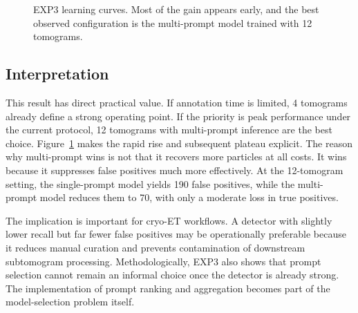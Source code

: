 \documentclass[12pt,a4paper]{report}
\begin{document}
\begin{figure}[H]
  \centering
  \caption{EXP3 learning curves. Most of the gain appears early, and the best observed configuration is the multi-prompt model trained with 12 tomograms.}
  \label{fig:exp3-learning-curve}
\end{figure}

\subsection{Interpretation}
This result has direct practical value. If annotation time is limited, 4 tomograms already define a strong operating point. If the priority is peak performance under the current protocol, 12 tomograms with multi-prompt inference are the best choice. Figure~\ref{fig:exp3-learning-curve} makes the rapid rise and subsequent plateau explicit. The reason why multi-prompt wins is not that it recovers more particles at all costs. It wins because it suppresses false positives much more effectively. At the 12-tomogram setting, the single-prompt model yields 190 false positives, while the multi-prompt model reduces them to 70, with only a moderate loss in true positives.

The implication is important for cryo-ET workflows. A detector with slightly lower recall but far fewer false positives may be operationally preferable because it reduces manual curation and prevents contamination of downstream subtomogram processing. Methodologically, EXP3 also shows that prompt selection cannot remain an informal choice once the detector is already strong. The implementation of prompt ranking and aggregation becomes part of the model-selection problem itself.
\end{document}
